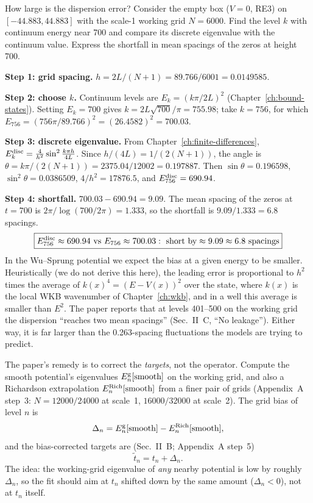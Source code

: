\begin{sample}{How large is the dispersion error?}
Consider the empty box ($V=0$, RE3) on $[-44.883,44.883]$ with the scale-1 working grid $N=6000$. Find the level $k$ with continuum energy near 700 and compare its discrete eigenvalue with the continuum value. Express the shortfall in mean spacings of the zeros at height 700.

\textbf{Step 1: grid spacing.} $h=2L/(N+1)=89.766/6001=0.0149585$.

\textbf{Step 2: choose $k$.} Continuum levels are $E_k=(k\pi/2L)^2$ (Chapter~\ref{ch:bound-states}). Setting $E_k=700$ gives $k=2L\sqrt{700}/\pi=755.98$; take $k=756$, for which $E_{756}=(756\pi/89.766)^2=(26.4582)^2=700.03$.

\textbf{Step 3: discrete eigenvalue.} From Chapter~\ref{ch:finite-differences}, $E_k^{\rm disc}=\frac{4}{h^2}\sin^2\frac{k\pi h}{4L}$. Since $h/(4L)=1/(2(N+1))$, the angle is $\theta=k\pi/(2(N+1))=2375.04/12002=0.197887$. Then $\sin\theta=0.196598$, $\sin^2\theta=0.0386509$, $4/h^2=17876.5$, and $E^{\rm disc}_{756}=690.94$.

\textbf{Step 4: shortfall.} $700.03-690.94=9.09$. The mean spacing of the zeros at $t=700$ is $2\pi/\log(700/2\pi)=1.333$, so the shortfall is $9.09/1.333=6.8$ spacings.
\[
\boxed{E^{\rm disc}_{756}\approx690.94\ \text{vs}\ E_{756}\approx700.03:\ \text{short by}\approx9.09\approx6.8\ \text{spacings}}
\]
In the Wu--Sprung potential we expect the bias at a given energy to be smaller. Heuristically (we do not derive this here), the leading error is proportional to $h^2$ times the average of $k(x)^4=(E-V(x))^2$ over the state, where $k(x)$ is the local WKB wavenumber of Chapter~\ref{ch:wkb}, and in a well this average is smaller than $E^2$. The paper reports that at levels 401--500 on the working grid the dispersion ``reaches two mean spacings'' (Sec.~II~C, ``No leakage''). Either way, it is far larger than the 0.263-spacing fluctuations the models are trying to predict.
\end{sample}

The paper's remedy is to correct the \emph{targets}, not the operator. Compute the smooth potential's eigenvalues $E_n^{\rm g}[\text{smooth}]$ on the working grid, and also a Richardson extrapolation $E_n^{\rm Rich}[\text{smooth}]$ from a finer pair of grids (Appendix~A step~3: $N=12000/24000$ at scale~1, $16000/32000$ at scale~2). The grid bias of level $n$ is
\begin{equation}
\Delta_n=E_n^{\rm g}[\text{smooth}]-E_n^{\rm Rich}[\text{smooth}],
\label{eq:paper-setup-delta}
\end{equation}
and the bias-corrected targets are (Sec.~II~B; Appendix~A step~5)
\begin{equation}
\tilde t_n=t_n+\Delta_n .
\label{eq:paper-setup-target}
\end{equation}
The idea: the working-grid eigenvalue of \emph{any} nearby potential is low by roughly $\Delta_n$, so the fit should aim at $t_n$ shifted down by the same amount ($\Delta_n<0$), not at $t_n$ itself.


